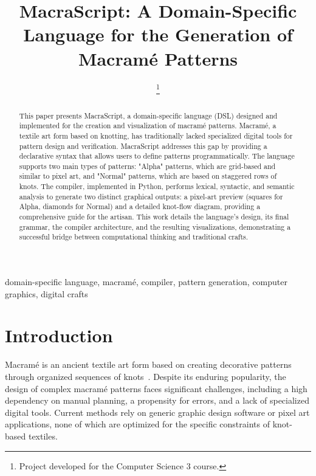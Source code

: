 \documentclass[conference]{IEEEtran}
\begin{document}
\title{MacraScript: A Domain-Specific Language for the Generation of Macramé Patterns}

\author{
\thanks{Project developed for the Computer Science 3 course.}}

\maketitle

\begin{abstract}
This paper presents MacraScript, a domain-specific language (DSL) designed and implemented for the creation and visualization of macramé patterns. Macramé, a textile art form based on knotting, has traditionally lacked specialized digital tools for pattern design and verification. MacraScript addresses this gap by providing a declarative syntax that allows users to define patterns programmatically. The language supports two main types of patterns: "Alpha" patterns, which are grid-based and similar to pixel art, and "Normal" patterns, which are based on staggered rows of knots. The compiler, implemented in Python, performs lexical, syntactic, and semantic analysis to generate two distinct graphical outputs: a pixel-art preview (squares for Alpha, diamonds for Normal) and a detailed knot-flow diagram, providing a comprehensive guide for the artisan. This work details the language's design, its final grammar, the compiler architecture, and the resulting visualizations, demonstrating a successful bridge between computational thinking and traditional crafts.
\end{abstract}

\begin{IEEEkeywords}
domain-specific language, macramé, compiler, pattern generation, computer graphics, digital crafts
\end{IEEEkeywords}

\section{Introduction}
Macramé is an ancient textile art form based on creating decorative patterns through organized sequences of knots~\cite{karner2005}. Despite its enduring popularity, the design of complex macramé patterns faces significant challenges, including a high dependency on manual planning, a propensity for errors, and a lack of specialized digital tools. Current methods rely on generic graphic design software or pixel art applications, none of which are optimized for the specific constraints of knot-based textiles.
\end{document}
